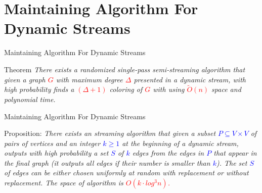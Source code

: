 \documentclass[aspectratio=169,xcolor=dvipsnames]{beamer}
\begin{document}
	\section{Maintaining Algorithm For Dynamic Streams}
	
	\begin{frame}{Maintaining Algorithm For Dynamic Streams}
		
		\begin{block}{Theorem}
			\textit{There exists a randomized single-pass semi-streaming algorithm that given a graph \textcolor{red}{$G$} with maximum degree \textcolor{red}{$\Delta$} presented in a dynamic stream, with high probability finds a \textcolor{red}{$(\Delta + 1)$} coloring of \textcolor{red}{$G$} with using \textcolor{red}{$\tilde{O}(n)$} space and polynomial time.}
		\end{block}
		
	\end{frame}
	
	\begin{frame}{Maintaining Algorithm For Dynamic Streams}
		
		\begin{alertblock}{}
			Proposition: \textit{There exists an streaming algorithm that given a subset \textcolor{blue}{$P \subseteq V\times V $} of pairs of vertices and an integer \textcolor{blue}{$k \geq 1$} at the beginning of a dynamic stream, outputs with high probability a set \textcolor{blue}{$S$} of \textcolor{blue}{$k$} edges from the edges in \textcolor{blue}{$P$} that appear in the final graph (it outputs all edges if their number is smaller than \textcolor{blue}{$k$}). The set \textcolor{blue}{$S$} of edges can be either chosen uniformly at random with replacement or without replacement. The space of algorithm is \textcolor{red}{$O(k\cdot log^3 n)$.}}
		\end{alertblock}
		
	\end{frame}
	
\end{document}
